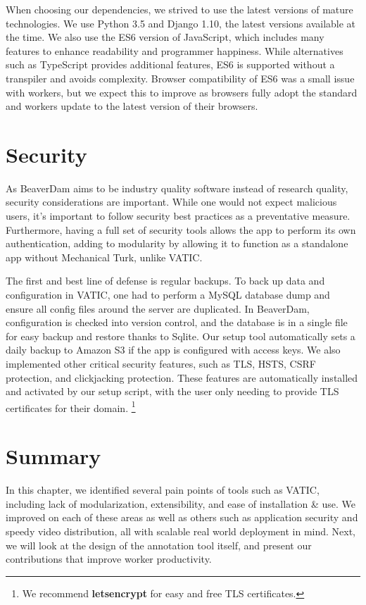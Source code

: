 When choosing our dependencies, we strived to use the latest versions of mature technologies.
We use Python 3.5 and Django 1.10, the latest versions available at the time.
We also use the ES6 version of JavaScript, which includes many features to enhance readability and programmer happiness.
While alternatives such as TypeScript provides additional features, ES6 is supported without a transpiler and avoids complexity.
Browser compatibility of ES6 was a small issue with workers, but we expect this to improve as browsers fully adopt the standard and workers update to the latest version of their browsers.

\section{Security}

As BeaverDam aims to be industry quality software instead of research quality, security considerations are important.
While one would not expect malicious users, it's important to follow security best practices as a preventative measure.
Furthermore, having a full set of security tools allows the app to perform its own authentication,
adding to modularity by allowing it to function as a standalone app without Mechanical Turk, unlike VATIC.

The first and best line of defense is regular backups.
To back up data and configuration in VATIC, one had to perform a MySQL database dump and ensure all config files around the server are duplicated.
In BeaverDam, configuration is checked into version control, and the database is in a single file for easy backup and restore thanks to Sqlite.
Our setup tool automatically sets a daily backup to Amazon S3 if the app is configured with access keys.
We also implemented other critical security features, such as TLS, HSTS, CSRF protection, and clickjacking protection.
These features are automatically installed and activated by our setup script,
with the user only needing to provide TLS certificates for their domain. \footnote{We recommend \textbf{letsencrypt} for easy and free TLS certificates.}

\section{Summary}
In this chapter, we identified several pain points of tools such as VATIC, including lack of modularization, extensibility, and ease of installation \& use.
We improved on each of these areas as well as others such as application security and speedy video distribution, all with scalable real world deployment in mind.
Next, we will look at the design of the annotation tool itself, and present our contributions that improve worker productivity.

